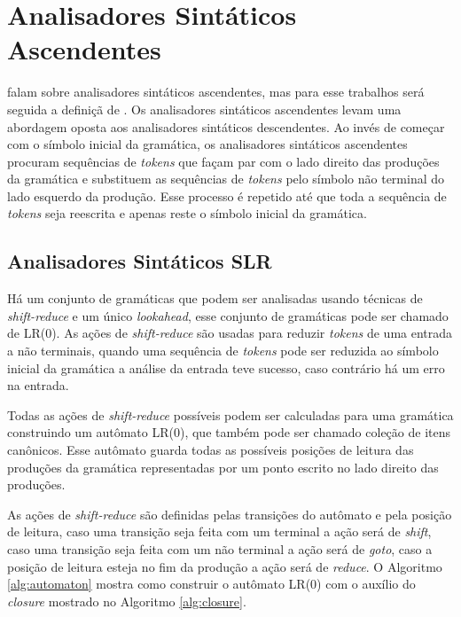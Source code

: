 \section{Analisadores Sintáticos Ascendentes}
\textcite{cooper2022engineering,mogensen2024introduction, thain2020introduction} falam sobre analisadores sintáticos ascendentes, mas para esse trabalhos será seguida a definiçã de \textcite{thain2020introduction}. Os analisadores sintáticos ascendentes levam uma abordagem oposta aos analisadores sintáticos descendentes. Ao invés de começar com o símbolo inicial da gramática, os analisadores sintáticos ascendentes procuram sequências de \textit{tokens} que façam par com o lado direito das produções da gramática e substituem as sequências de \textit{tokens} pelo símbolo não terminal do lado esquerdo da produção. Esse processo é repetido até que toda a sequência de \textit{tokens} seja reescrita e apenas reste o símbolo inicial da gramática.

\subsection{Analisadores Sintáticos SLR}
Há um conjunto de gramáticas que podem ser analisadas usando técnicas de \textit{shift-reduce} e um único \textit{lookahead}, esse conjunto de gramáticas pode ser chamado de LR(0). As ações de \textit{shift-reduce} são usadas para reduzir \textit{tokens} de uma entrada a não terminais, quando uma sequência de \textit{tokens} pode ser reduzida ao símbolo inicial da gramática a análise da entrada teve sucesso, caso contrário há um erro na entrada.

Todas as ações de \textit{shift-reduce} possíveis podem ser calculadas para uma gramática construindo um autômato LR(0), que também pode ser chamado coleção de itens canônicos. Esse autômato guarda todas as possíveis posições de leitura das produções da gramática representadas por um ponto escrito no lado direito das produções.

As ações de \textit{shift-reduce} são definidas pelas transições do autômato e pela posição de leitura, caso uma transição seja feita com um terminal a ação será de \textit{shift}, caso uma transição seja feita com um não terminal a ação será de \textit{goto}, caso a posição de leitura esteja no fim da produção a ação será de \textit{reduce}. O Algoritmo \ref{alg:automaton} mostra como construir o autômato LR(0) com o auxílio do \textit{closure} mostrado no Algoritmo \ref{alg:closure}.

